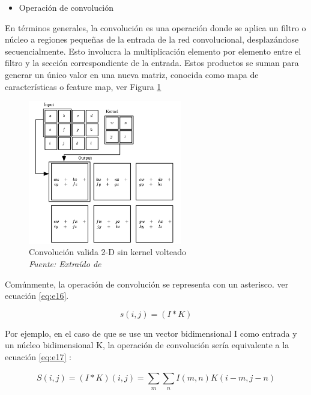  \begin{itemize}
\item Operación de convolución
 \end{itemize}


En términos generales, la convolución es una operación donde se  aplica un filtro o núcleo a regiones pequeñas de la entrada de la red convolucional, desplazándose secuencialmente. Esto involucra la multiplicación elemento por elemento entre el filtro y la sección correspondiente de la entrada. Estos productos se suman para generar un único valor en una nueva matriz, conocida como mapa de características o feature map, ver Figura \ref{fig:an10}

\begin{figure}[h!]
	\includegraphics[width=0.6\textwidth]{capitulo2/figuras/an10.png}
	\caption[Convolución valida 2-D sin kernel volteado]{Convolución valida 2-D sin kernel volteado
		\\\textit{Fuente: Extraído de} \protect\cite[p. 334]{goodfellow2016deep}}
	\label{fig:an10}
\end{figure}

Comúnmente, la operación de convolución se representa con un asterisco. ver ecuación \ref{eq:e16}.

\begin{equation} \label{eq:e16} 
	s(i,j)=(I\ast K)
\end{equation}

Por ejemplo, en el caso de que se use un vector bidimensional I como entrada y un núcleo bidimensional K, la operación de convolución sería equivalente a la ecuación \ref{eq:e17} :

\begin{equation} \label{eq:e17} 
	S(i,j)=(I\ast K)(i,j)=\sum_{m}^{}\sum_{n}^{}I(m,n)K(i-m,j-n)
\end{equation}

